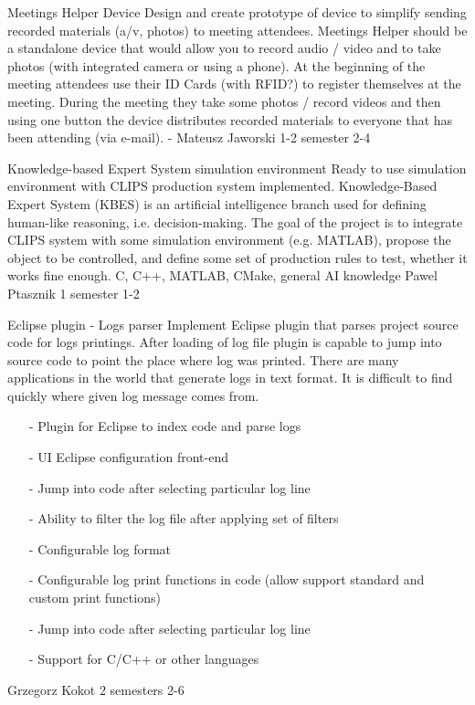 \begin{project}
{Meetings Helper Device}
{Design and create prototype of device to simplify sending recorded materials
(a/v, photos) to meeting attendees.} {
Meetings Helper should be a standalone device that would allow you to record audio / video 
and to take photos (with integrated camera or using a phone). At the beginning of the meeting 
attendees use their ID Cards (with RFID?) to register themselves at the meeting. 
During the meeting they take some photos / record videos and then using one button 
the device distributes recorded materials to everyone that has been attending (via e-mail). }
{-}
{Mateusz Jaworski}
{1-2 semester}
{2-4}
\end{project}
\begin{project}
{Knowledge-based Expert System simulation environment}
{Ready to use simulation environment with CLIPS production system implemented.}
{
Knowledge-Based Expert System (KBES) is an artificial intelligence branch used for defining human-like reasoning, i.e. decision-making. The goal of the project is to integrate CLIPS system with some simulation environment (e.g. MATLAB), propose the object to be controlled, and define some set of production rules to test, whether it works fine enough. }
{C, C++, MATLAB, CMake, general AI knowledge}
{Pawel Ptasznik}
{1 semester}
{1-2}
\end{project}
\begin{project}
{Eclipse plugin - Logs parser}
{
Implement Eclipse plugin that parses project source code for logs printings.
After loading of log file plugin is capable to jump into source code to point
the place where log was printed.
There are many applications in the world that generate logs in text format. It is difficult to find quickly where given log message comes from. 
}
{
 \begin{itemize}
  \item[-] Plugin for Eclipse to index code and parse logs
  \item[-] UI Eclipse configuration front-end
  \item[-] Jump into code after selecting particular log line
  \item[-] Ability to filter the log file after applying set of filters
\end{itemize}
}
{
 \begin{itemize}
  \item[-] Configurable log format
  \item[-] Configurable log print functions in code (allow support standard and custom print functions)
  \item[-] Jump into code after selecting particular log line
  \item[-] Support for C/C++ or other languages
\end{itemize}
}
{Grzegorz Kokot}
{2 semesters}
{2-6}
\end{project}
